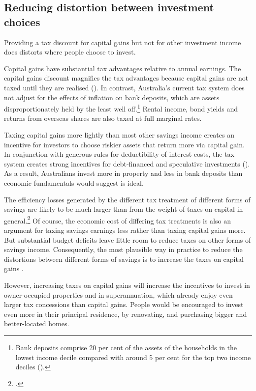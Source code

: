 \subsection{Reducing distortion between investment choices}\label{subsubsec:reducing-distortion-between-investment-choices}
Providing a tax discount for capital gains but not for other investment income does distorts where people choose to invest. 

Capital gains have substantial tax advantages relative to annual earnings. The capital gains discount magnifies the tax advantages because capital gains are not taxed until they are realised (). In contrast, Australia’s current tax system does not adjust for the effects of inflation on bank deposits, which are assets disproportionately held by the least well off.\footnote{Bank deposits comprise 20 per cent of the assets of the households in the lowest income decile compared with around 5 per cent for the top two income deciles (\textcite{HILDA2015}).}  Rental income, bond yields and returns from overseas shares are also taxed at full marginal rates. 

Taxing capital gains more lightly than most other savings income creates an incentive for investors to choose riskier assets that return more via capital gain. In conjunction with generous rules for deductibility of interest costs, the tax system creates strong incentives for debt-financed and speculative investments (). As a result, Australians invest more in property and less in bank deposits than economic fundamentals would suggest is ideal.

The efficiency losses generated by the different tax treatment of different forms of savings are likely to be much larger than from the weight of taxes on capital in general.\footcites[][16]{Ingles2009TaxEquity}[][22]{Ingles2015}  Of course, the economic cost of differing tax treatments is also an argument for taxing savings earnings less rather than taxing capital gains more. But substantial budget deficits leave little room to reduce taxes on other forms of savings income. Consequently, the most plausible way in practice to reduce the distortions between different forms of savings is to increase the taxes on capital gains . 

However, increasing taxes on capital gains will increase the incentives to invest in owner-occupied properties and in superannuation, which already enjoy even larger tax concessions than capital gains. People would be encouraged to invest even more in their principal residence, by renovating, and purchasing bigger and better-located homes. 

